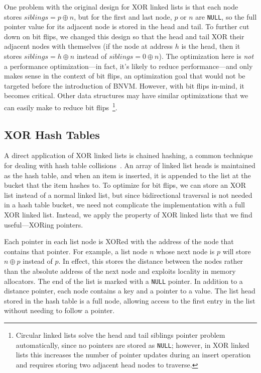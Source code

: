 One problem with the original design for XOR linked lists is that each node
stores $siblings = p \oplus n$, but for the first and last node, $p$ or $n$ are
\texttt{NULL}, so the full pointer value for its adjacent node is stored in the
head and tail. To further cut down on bit flips, we changed this design so that
the head and tail XOR their adjacent nodes with themselves (if the node at
address $h$ is the head, then it stores $siblings = h \oplus n$ instead of
$siblings = 0 \oplus n$). The optimization here is \textit{not} a performance
optimization---in fact, it's likely to reduce performance---and only makes sense
in the context of bit flips, an optimization goal that would not be
targeted before the introduction of BNVM. However, with bit flips in-mind, it
becomes critical. Other data structures may have similar optimizations that we
can easily make to reduce bit flips~\footnote{Circular linked
	lists solve the head and tail siblings pointer problem automatically, since no pointers are
	stored as \texttt{NULL}; however, in XOR linked lists this increases the number of pointer
	updates during an insert operation and requires storing two adjacent head nodes to traverse.
}.

\subsection{XOR Hash Tables}
\label{sec:xht_design}

A direct application of XOR linked lists is chained hashing, a common
technique for dealing with hash table collisions~\cite{clrs}. An array of linked list heads
is maintained as the hash table, and when an item is inserted, it is appended to
the list at the bucket that the item hashes to. To optimize for bit flips,
we can store an XOR list instead of a normal linked list, but
since bidirectional traversal is not needed in a hash table
bucket, we need not complicate the implementation with a full XOR linked
list. Instead, we apply the property of XOR linked lists that we find
useful---XORing pointers.

Each pointer in each list node is XORed with the address of the node that
contains that pointer. For example, a list node $n$ whose next node is $p$ will
store $n \oplus p$ instead of $p$. In effect, this stores the distance between
the nodes rather than the absolute address of the next node and exploits
locality in memory allocators. The end of the list is marked with a \texttt{NULL}
pointer. In addition to a distance pointer, each node contains a key and a
pointer to a value. The list head stored in the hash table is a full node,
allowing access to the first entry in the list without needing to follow a
pointer.

